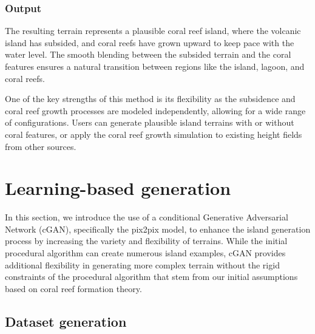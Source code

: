 \subsubsection{Output}
\label{sec:coral-island_procedural-output}

The resulting terrain represents a plausible coral reef island, where the volcanic island has subsided, and coral reefs have grown upward to keep pace with the water level. The smooth blending between the subsided terrain and the coral features ensures a natural transition between regions like the island, lagoon, and coral reefs.

One of the key strengths of this method is its flexibility as the subsidence and coral reef growth processes are modeled independently, allowing for a wide range of configurations. Users can generate plausible island terrains with or without coral features, or apply the coral reef growth simulation to existing height fields from other sources.



\section{Learning-based generation}
\label{sec:coral-island_cGAN-training}

In this section, we introduce the use of a conditional Generative Adversarial Network (cGAN), specifically the pix2pix model, to enhance the island generation process by increasing the variety and flexibility of terrains. While the initial procedural algorithm can create numerous island examples, cGAN provides additional flexibility in generating more complex terrain without the rigid constraints of the procedural algorithm that stem from our initial assumptions based on coral reef formation theory.








\subsection{Dataset generation}
\label{sec:coral-island_dataset-generation}


